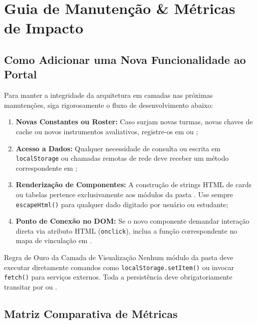 \section{Guia de Manutenção \& Métricas de Impacto}\label{sec:extensao}

\subsection{Como Adicionar uma Nova Funcionalidade ao Portal}

Para manter a integridade da arquitetura em camadas nas próximas manutenções, siga rigorosamente o fluxo de desenvolvimento abaixo:

\begin{enumerate}
  \item \textbf{Novas Constantes ou Roster:} Caso surjam novas turmas, novas chaves de cache ou novos instrumentos avaliativos, registre-os em  ou ;
  \item \textbf{Acesso a Dados:} Qualquer necessidade de consulta ou escrita em \texttt{localStorage} ou chamadas remotas de rede deve receber um método correspondente em ;
  \item \textbf{Renderização de Componentes:} A construção de strings HTML de cards ou tabelas pertence exclusivamente aos módulos da pasta . Use sempre \texttt{escapeHtml()} para qualquer dado digitado por usuário ou estudante;
  \item \textbf{Ponto de Conexão no DOM:} Se o novo componente demandar interação direta via atributo HTML (\texttt{onclick}), inclua a função correspondente no mapa de vinculação em .
\end{enumerate}

\begin{atencao}{Regra de Ouro da Camada de Visualização}
Nenhum módulo da pasta  deve executar diretamente comandos como \texttt{localStorage.setItem()} ou invocar \texttt{fetch()} para serviços externos. Toda a persistência deve obrigatoriamente transitar por  ou .
\end{atencao}

\subsection{Matriz Comparativa de Métricas}

